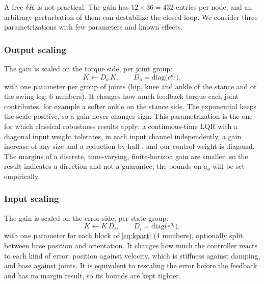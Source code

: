 \documentclass[conference]{IEEEtran}
\begin{document}
A free $\delta K$ is not practical.
The gain has $12\times36=432$ entries per node, and an arbitrary perturbation of them can destabilize the closed loop.
We consider three parametrizations with few parameters and known effects.

\subsubsection{Output scaling}
The gain is scaled on the torque side, per joint group:
\begin{equation}
K\leftarrow D_o\,K,\qquad D_o=\mathrm{diag}\big(e^{a_o}\big),
\label{eq:dout}
\end{equation}
with one parameter per group of joints (hip, knee and ankle of the stance and of the swing leg: 6 numbers).
It changes how much feedback torque each joint contributes, for example a softer ankle on the stance side.
The exponential keeps the scale positive, so a gain never changes sign.
This parametrization is the one for which classical robustness results apply: a continuous-time LQR with a diagonal input weight tolerates, in each input channel independently, a gain increase of any size and a reduction by half \cite{safonov1977margins}, and our control weight is diagonal.
The margins of a discrete, time-varying, finite-horizon gain are smaller, so the result indicates a direction and not a guarantee; the bounds on $a_o$ will be set empirically.

\subsubsection{Input scaling}
The gain is scaled on the error side, per state group:
\begin{equation}
K\leftarrow K\,D_i,\qquad D_i=\mathrm{diag}\big(e^{a_i}\big),
\end{equation}
with one parameter for each block of \eqref{eq:kpart} (4 numbers), optionally split between base position and orientation.
It changes how much the controller reacts to each kind of error: position against velocity, which is stiffness against damping, and base against joints.
It is equivalent to rescaling the error before the feedback and has no margin result, so its bounds are kept tighter.
\end{document}
